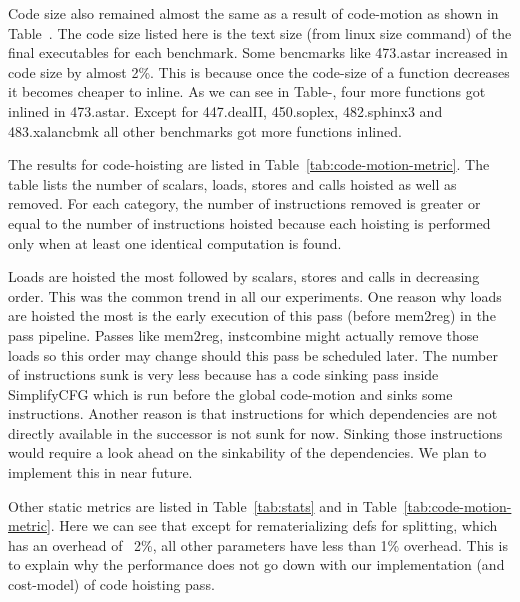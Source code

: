 \documentclass[acmlarge,review,anonymous]{acmart}\settopmatter{printfolios=true}
\begin{document}
Code size also remained almost the same as a result of code-motion as shown in
Table~\cite{tab:code-size}.  The code size listed here is the text size (from
linux size command) of the final executables for each benchmark.  Some bencmarks
like 473.astar increased in code size by almost 2\%. This is because once the
code-size of a function decreases it becomes cheaper to inline. As we can see in
Table-\cite{tab:stats}, four more functions got inlined in 473.astar. Except for
447.dealII, 450.soplex, 482.sphinx3 and 483.xalancbmk all other benchmarks got
more functions inlined.

The results for code-hoisting are listed in
Table~\ref{tab:code-motion-metric}. The table lists the number of scalars,
loads, stores and calls hoisted as well as removed. For each category, the
number of instructions removed is greater or equal to the number of instructions
hoisted because each hoisting is performed only when at least one identical
computation is found.

Loads are hoisted the most followed by scalars, stores and calls in decreasing
order.  This was the common trend in all our experiments. One reason why loads
are hoisted the most is the early execution of this pass (before mem2reg) in the
\LLVM{} pass pipeline. Passes like mem2reg, instcombine might actually remove
those loads so this order may change should this pass be scheduled later. The number
of instructions sunk is very less because \LLVM{} has a code sinking pass inside SimplifyCFG
which is run before the global code-motion and sinks some instructions. Another reason is
that instructions for which dependencies are not directly available in the successor is
not sunk for now. Sinking those instructions would require a look ahead on the sinkability
of the dependencies. We plan to implement this in near future.

Other static metrics are listed in Table~\ref{tab:stats} and in
Table~\ref{tab:code-motion-metric}.  Here we can see that except for
rematerializing defs for splitting, which has an overhead of ~2\%, all other
parameters have less than 1\% overhead. This is to explain why the performance
does not go down with our implementation (and cost-model) of code hoisting pass.
\end{document}
